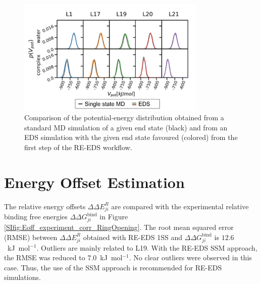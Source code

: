 \begin{figure}[H]
\centering
     \includegraphics[width=0.8\textwidth]{fig/results/ringOpening/paramExploration/single_state_energy_sampling.png}
    \caption{Comparison of the potential-energy distribution obtained from a standard MD simulation of a given end state (black) and from an EDS simulation with the given end state favoured (colored) from the first step of the RE-EDS workflow.}
     \label{fig:CHK1_set2_stateOptimization_EnergyDistribution}
\end{figure}

\newpage
\section{Energy Offset Estimation}
The relative energy offsets $\Delta \Delta E^R_{ji}$ are compared with the experimental relative binding free energies $\Delta \Delta G^\text{bind}_{ji}$ in Figure \ref{SIfig:Eoff_experiment_corr_RingOpening}. 
The root mean squared error (RMSE) between $\Delta \Delta E^R_{ji}$ obtained with RE-EDS 1SS and $\Delta \Delta G^\text{bind}_{ji}$ is $12.6$~kJ~mol$^{-1}$. Outliers are mainly related to L19.
With the RE-EDS SSM approach, the RMSE was reduced to $7.0$~kJ~mol$^{-1}$. No clear outliers were observed in this case. Thus, the use of the SSM approach is recommended for RE-EDS simulations.


